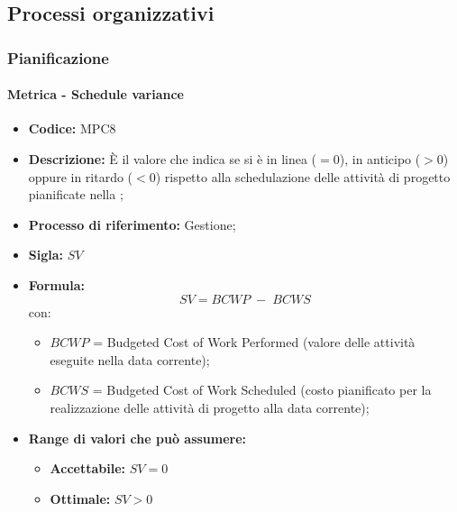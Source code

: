 \subsection{Processi organizzativi}

\subsubsection{Pianificazione}
    \paragraph{Metrica - Schedule variance}
    \begin{itemize}
        \item \textbf{Codice:} MPC8
        \item \textbf{Descrizione:} È il valore che indica se si è in linea ($=0$), in anticipo ($>0$) oppure in ritardo ($<0$) rispetto alla schedulazione delle attività di progetto pianificate nella ;
        \item \textbf{Processo di riferimento:} Gestione;
        \item \textbf{Sigla:} $SV$
        \item \textbf{Formula:} $$SV = {BCWP \; - \; BCWS}$$
        con:
        \begin{itemize}
            \item $BCWP$ = Budgeted Cost of Work Performed (valore delle attività eseguite nella data corrente);
            \item $BCWS$ = Budgeted Cost of Work Scheduled (costo pianificato per la realizzazione delle attività di progetto alla data corrente);
        \end{itemize}
        \item \textbf{Range di valori che può assumere:}
        \begin{itemize}
            \item \textbf{Accettabile:} $SV = 0$
            \item \textbf{Ottimale:} $SV > 0$
        \end{itemize}
    \end{itemize}

